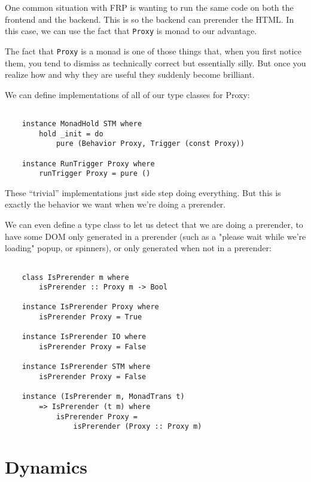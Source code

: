 \documentclass{article}
\begin{document}
One common situation with FRP is wanting to run the same code on both
the frontend and the backend.  This is so the backend can prerender
the HTML.  In this case, we can use the fact that \verb|Proxy| is monad
to our advantage.  

The fact that \verb|Proxy| is a monad is one of those things that, when
you first notice them, you tend to dismiss as technically correct but
essentially silly.  But once you realize how and why they are useful
they suddenly become brilliant.

We can define implementations of all of our type classes for Proxy:

\begin{verbatim}

    instance MonadHold STM where
        hold _init = do
            pure (Behavior Proxy, Trigger (const Proxy))

    instance RunTrigger Proxy where
        runTrigger Proxy = pure ()

\end{verbatim}

These ``trivial'' implementations just side step doing everything.  But
this is exactly the behavior we want when we're doing a prerender.

We can even define a type class to let us detect that we are doing a
prerender, to have some DOM only generated in a prerender (such as a
"please wait while we're loading" popup, or spinners), or only generated
when not in a prerender:

\begin{verbatim}

    class IsPrerender m where
        isPrerender :: Proxy m -> Bool

    instance IsPrerender Proxy where
        isPrerender Proxy = True

    instance IsPrerender IO where
        isPrerender Proxy = False

    instance IsPrerender STM where
        isPrerender Proxy = False

    instance (IsPrerender m, MonadTrans t)
        => IsPrerender (t m) where
            isPrerender Proxy =
                isPrerender (Proxy :: Proxy m)

\end{verbatim}

\section{Dynamics}
\end{document}
